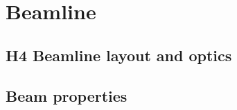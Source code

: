 \section{Beamline}
\label{sec:h4beamline}

\subsection{H4 Beamline layout and optics}

\subsection{Beam properties}




